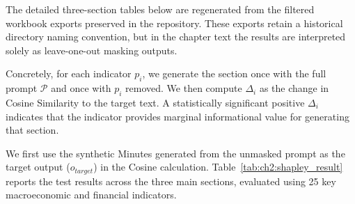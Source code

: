 The detailed three-section tables below are regenerated from the filtered workbook exports preserved in the repository. These exports retain a historical directory naming convention, but in the chapter text the results are interpreted solely as leave-one-out masking outputs.


Concretely, for each indicator $p_i$, we generate the section once with the full prompt $\mathcal{P}$ and once with $p_i$ removed. We then compute $\Delta_i$ as the change in Cosine Similarity to the target text. A statistically significant positive $\Delta_i$ indicates that the indicator provides marginal informational value for generating that section.

We first use the synthetic Minutes generated from the unmasked prompt as the target output ($o_{target}$) in the Cosine calculation. Table~\ref{tab:ch2:shapley_result} reports the test results across the three main sections, evaluated using 25 key macroeconomic and financial indicators.

